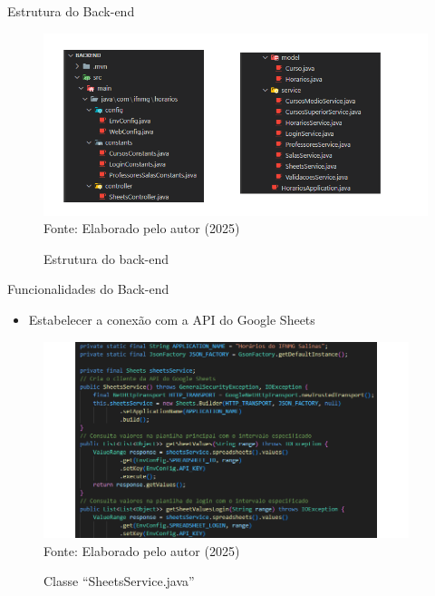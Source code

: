 \begin{frame}{Estrutura do Back-end}
    \begin{figure}
        \centering
        \vspace{-0.5cm}
        \caption{Estrutura do back-end}
        \vspace{-0.2cm}
        \includegraphics[width=1\textwidth]{figuras/back-1.png}
        \\ %
        \footnotesize Fonte: Elaborado pelo autor (2025)
    \end{figure}
\end{frame}

\begin{frame}{Funcionalidades do Back-end}
    \begin{itemize}
        \item Estabelecer a conexão com a API do Google Sheets
    \end{itemize}
    \begin{figure}
        \centering
        \vspace{-0.4cm}
        \caption{Classe ``SheetsService.java''}
        \vspace{-0.2cm}
        \includegraphics[width=0.95\textwidth]{figuras/back-2.png}
        \\ %
        \footnotesize Fonte: Elaborado pelo autor (2025)
    \end{figure}
\end{frame}

